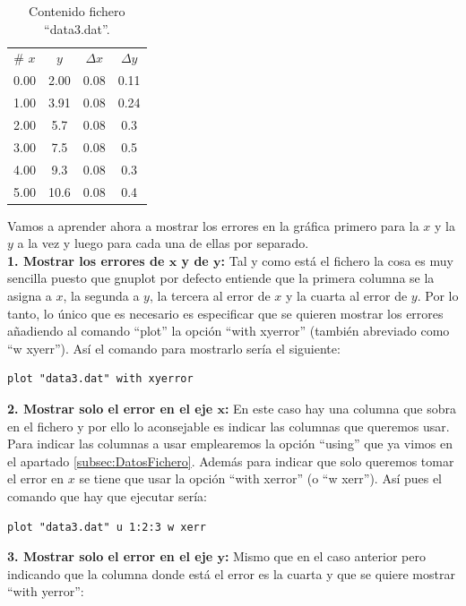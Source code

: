 \documentclass[11pt,a4paper,twoside,pdf]{article}
\numberwithin{equation}{section}
\begin{document}
\begin{table}[h]
    \centering
    \caption{Contenido fichero ``data3.dat''.}
    \label{tab:data_plot_errores}
    \begin{tabular}{cccc}
        \# $x$ & $y$ & $\Delta x$ & $\Delta y$ \\
        0.00 & 2.00 & 0.08 & 0.11 \\
        1.00 & 3.91 & 0.08 & 0.24 \\
        2.00 & 5.7 & 0.08 & 0.3 \\
        3.00 & 7.5 & 0.08 & 0.5 \\
        4.00 & 9.3 & 0.08 & 0.3 \\
        5.00 & 10.6 & 0.08 & 0.4
    \end{tabular}
\end{table}

Vamos a aprender ahora a mostrar los errores en la gráfica primero para la $x$ y la $y$ a la vez y luego para cada una de ellas por separado. \\

\textbf{1. Mostrar los errores de $\mathbf{x}$ y de $\mathbf{y}$:} Tal y como está el fichero la cosa es muy sencilla puesto que gnuplot por defecto entiende que la primera columna se la asigna a $x$, la segunda a $y$, la tercera al error de $x$ y la cuarta al error de $y$. Por lo tanto, lo único que es necesario es especificar que se quieren mostrar los errores añadiendo al comando ``plot'' la opción ``with xyerror'' (también abreviado como ``w xyerr''). Así el comando para mostrarlo sería el siguiente:

\begin{lstlisting}[language=Gnuplot]
plot "data3.dat" with xyerror
\end{lstlisting}

\textbf{2. Mostrar solo el error en el eje $\mathbf{x}$:} En este caso hay una columna que sobra en el fichero y por ello lo aconsejable es indicar las columnas que queremos usar. Para indicar las columnas a usar emplearemos la opción ``using'' que ya vimos en el apartado \ref{subsec:DatosFichero}. Además para indicar que solo queremos tomar el error en $x$ se tiene que usar la opción ``with xerror'' (o ``w xerr''). Así pues el comando que hay que ejecutar sería:

\begin{lstlisting}[language=Gnuplot]
plot "data3.dat" u 1:2:3 w xerr
\end{lstlisting}

\textbf{3. Mostrar solo el error en el eje $\mathbf{y}$:} Mismo que en el caso anterior pero indicando que la columna donde está el error es la cuarta y que se quiere mostrar ``with yerror'':
\end{document}
